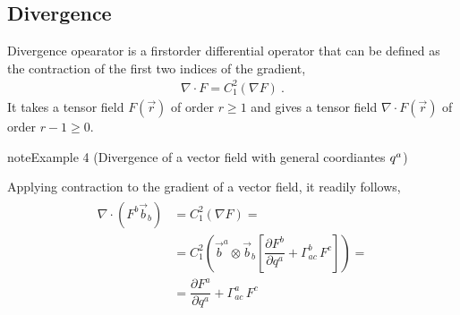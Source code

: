 \documentclass[letterpaper,10pt,english]{jupyterBook}
\begin{document}
\subsection{Divergence}
\label{\detokenize{ch/tensor-algebra-calculus/calculus-euclidean:divergence}}\label{\detokenize{ch/tensor-algebra-calculus/calculus-euclidean:tensor-calculus-differential-operators-divergence}}
\sphinxAtStartPar
Divergence opearator is a first\sphinxhyphen{}order differential operator that can be defined as the contraction of the first two indices of the gradient,
\begin{equation*}
\begin{split}\nabla \cdot F = C_{1}^{2}\left( \nabla F \right) \ .\end{split}
\end{equation*}
\sphinxAtStartPar
It takes a tensor field \(F(\vec{r})\) of order \(r \ge 1\) and gives a tensor field \(\nabla \cdot F(\vec{r})\) of order \(r-1 \ge 0\).
\label{ch/tensor-algebra-calculus/calculus-euclidean:example-7}
\begin{sphinxadmonition}{note}{Example 4 (Divergence of a vector field \sphinxhyphen{} with general coordiantes \protect\(q^{a}\protect\))}



\sphinxAtStartPar
Applying contraction to the gradient of a vector field, it readily follows,
\begin{equation*}
\begin{split}\begin{aligned}
  \nabla \cdot \left( F^b \vec{b}_b \right)
  & = C_{1}^{2} \left( \nabla F \right) = \\
  & = C_1^2 \left( \vec{b}^a \otimes \vec{b}_b \left[ \dfrac{\partial F^b}{\partial q^a} + \Gamma_{ac}^b \, F^c \right] \right) = \\
  & = \dfrac{\partial F^a}{\partial q^a} + \Gamma_{ac}^a \, F^c
\end{aligned}\end{split}
\end{equation*}\end{sphinxadmonition}
\label{ch/tensor-algebra-calculus/calculus-euclidean:example-8}
\end{document}
